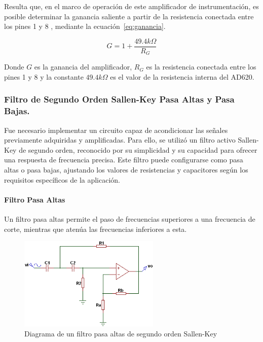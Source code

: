             Resulta que, en el marco de operación de este amplificador de instrumentación, es posible determinar la ganancia saliente a partir de la resistencia conectada entre los pines 1 y 8 \cite{AD620_AnalogDevices}, mediante la ecuación~\ref{eq:ganancia}.

            \begin{equation}
                \label{eq:ganancia}
                G = 1 + \frac{49.4 k\Omega}{R_G}
            \end{equation}

            Donde $G$ es la ganancia del amplificador, $R_G$ es la resistencia conectada entre los pines 1 y 8 y la constante $49.4 k\Omega$ es el valor de la resistencia interna del AD620.


        \subsubsection{Filtro de Segundo Orden Sallen-Key Pasa Altas y Pasa Bajas.}
            Fue necesario implementar un circuito capaz de acondicionar las señales previamente adquiridas y amplificadas. Para ello, se utilizó un filtro activo Sallen-Key de segundo orden, reconocido por su simplicidad y su capacidad para ofrecer una respuesta de frecuencia precisa. Este filtro puede configurarse como pasa altas o pasa bajas, ajustando los valores de resistencias y capacitores según los requisitos específicos de la aplicación.

            \paragraph{Filtro Pasa Altas}
                Un filtro pasa altas permite el paso de frecuencias superiores a una frecuencia de corte, mientras que atenúa las frecuencias inferiores a esta.

                \begin{figure}[H]
                    \centering
                    \includegraphics[width=0.6\textwidth]{img/Desarrollo/Filtro_Pasa_Altas.png}
                    \caption[Diagrama de un filtro pasa altas de segundo orden Sallen-Key.]{Diagrama de un filtro pasa altas de segundo orden Sallen-Key\footnotemark}
                    \label{fig:Filtro_Pasa_Altas}
                \end{figure}


